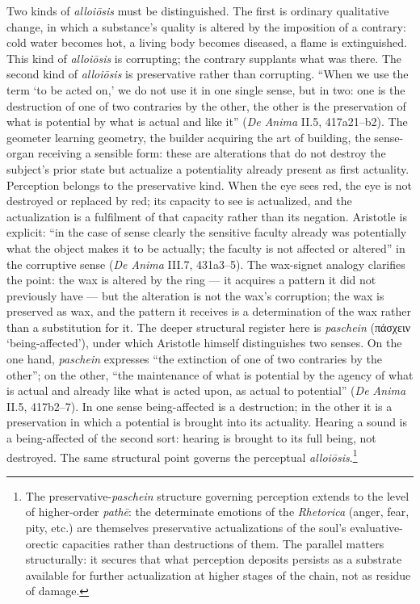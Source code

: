 \documentclass{article}
\newcommand{\gk}[1]{{\greekfont #1}}
\begin{document}
Two kinds of \textit{alloiōsis} must be distinguished. The first is ordinary qualitative change, in which a substance's quality is altered by the imposition of a contrary: cold water becomes hot, a living body becomes diseased, a flame is extinguished. This kind of \textit{alloiōsis} is corrupting; the contrary supplants what was there. The second kind of \textit{alloiōsis} is preservative rather than corrupting. ``When we use the term `to be acted on,' we do not use it in one single sense, but in two: one is the destruction of one of two contraries by the other, the other is the preservation of what is potential by what is actual and like it'' (\textit{De Anima} II.5, 417a21--b2). The geometer learning geometry, the builder acquiring the art of building, the sense-organ receiving a sensible form: these are alterations that do not destroy the subject's prior state but actualize a potentiality already present as first actuality. Perception belongs to the preservative kind. When the eye sees red, the eye is not destroyed or replaced by red; its capacity to see is actualized, and the actualization is a fulfilment of that capacity rather than its negation. Aristotle is explicit: ``in the case of sense clearly the sensitive faculty already was potentially what the object makes it to be actually; the faculty is not affected or altered'' in the corruptive sense (\textit{De Anima} III.7, 431a3--5). The wax-signet analogy clarifies the point: the wax is altered by the ring --- it acquires a pattern it did not previously have --- but the alteration is not the wax's corruption; the wax is preserved as wax, and the pattern it receives is a determination of the wax rather than a substitution for it. The deeper structural register here is \textit{paschein} (\gk{πάσχειν} `being-affected'), under which Aristotle himself distinguishes two senses. On the one hand, \textit{paschein} expresses ``the extinction of one of two contraries by the other''; on the other, ``the maintenance of what is potential by the agency of what is actual and already like what is acted upon, as actual to potential'' (\textit{De Anima} II.5, 417b2--7). In one sense being-affected is a destruction; in the other it is a preservation in which a potential is brought into its actuality. Hearing a sound is a being-affected of the second sort: hearing is brought to its full being, not destroyed. The same structural point governs the perceptual \textit{alloiōsis}.\footnote{The preservative-\textit{paschein} structure governing perception extends to the level of higher-order \textit{pathē}: the determinate emotions of the \textit{Rhetorica} (anger, fear, pity, etc.) are themselves preservative actualizations of the soul's evaluative-orectic capacities rather than destructions of them. The parallel matters structurally: it secures that what perception deposits persists as a substrate available for further actualization at higher stages of the chain, not as residue of damage.}
\end{document}
